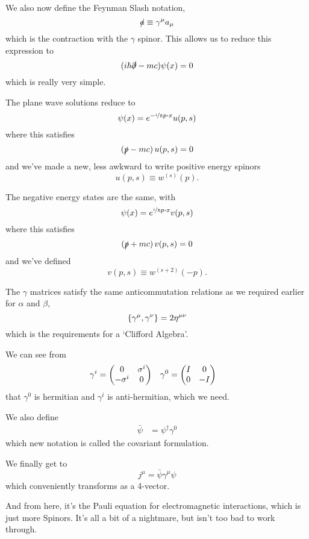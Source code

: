 \documentclass[]{revision-notes}
\begin{document}
We also now define the Feynman Slash notation, \[\slashed{a} \equiv \gamma^\mu a_\mu \] which is the contraction with the \(\gamma\) spinor.
This allows us to reduce this expression to \[ (i \hbar \slashed{\partial}- mc) \psi(x) = 0\] which is really very simple.

The plane wave solutions reduce to \[ \psi(x) = e^{-\nicefrac{i}{\hbar}p\vdot x} u(p, s) \] where this satisfies
\[ (\slashed{p} - mc)\, u(p, s) = 0 \]
and we've made a new, less awkward to write positive energy spinors \[ u(p, s) \equiv w^{(s)}(p).\]

The negative energy states are the same, with \[ \psi(x) = e^{\nicefrac{i}{\hbar}p\vdot x} v(p, s) \] where this satisfies
\[ (\slashed{p} + mc)\, v(p, s) = 0 \] and we've defined \[v(p, s) \equiv w^{(s + 2)}(-p).\]

The \(\gamma\) matrices satisfy the same anticommutation relations as we required earlier for \(\alpha\) and \(\beta\),
\[ \anticommutator{\gamma^\mu}{\gamma^\nu} = 2 \eta^{\mu\nu} \]
which is the requirements for a `Clifford Algebra'.

We can see from
\begin{align*}
  \gamma^i &= \mqty(0 & \sigma^i\\ - \sigma^i & 0) & \gamma^0 &= \mqty(I&0\\0&-I)
\end{align*} that \(\gamma^0\) is hermitian and \(\gamma^i \) is anti-hermitian, which we need.

We also define
\begin{align*}
  \bar{\psi} &= \psi^\dagger \gamma^0
\end{align*}
which new notation is called the covariant formulation.

We finally get to \[ j^\mu = \bar{\psi} \gamma^\mu \psi\] which conveniently transforms as a 4-vector.

\begin{note}
And from here, it's the Pauli equation for electromagnetic interactions, which is just more Spinors. It's all a bit of a nightmare, but isn't too bad to work through.
\end{note}



\printbibliography
\end{document}
